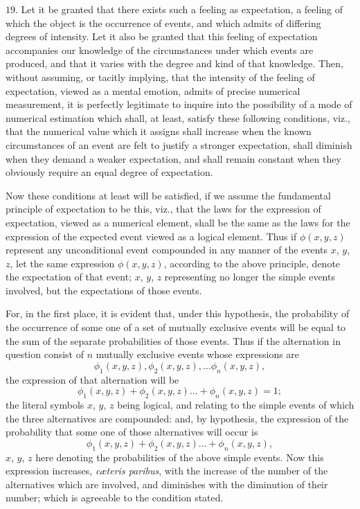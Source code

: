 \documentclass[oneside]{book}
\begin{document}
$19$. Let it be granted that there exists such a feeling as expectation,
a feeling of which the object is the occurrence of events,
and which admits of differing degrees of intensity. Let it also
be granted that this feeling of expectation accompanies our
knowledge of the circumstances under which events are produced,
and that it varies with the degree and kind of that knowledge.
Then, without assuming, or tacitly implying, that the intensity
of the feeling of expectation, viewed as a mental emotion, admits
of precise numerical measurement, it is perfectly legitimate to
inquire into the possibility of a mode of numerical estimation
which shall, at least, satisfy these following conditions, viz., that
the numerical value which it assigns shall increase when the
known circumstances of an event are felt to justify a stronger
expectation, shall diminish when they demand a weaker expectation,
and shall remain constant when they obviously require an
equal degree of expectation.

Now these conditions at least will be satisfied, if we assume
the fundamental principle of expectation to be this, viz., that the
laws for the expression of expectation, viewed as a numerical
element, shall be the same as the laws for the expression of the
expected event viewed as a logical element. Thus if $\phi(x, y, z)$ represent
any unconditional event compounded in any manner of
the events $x$, $y$, $z$, let the same expression $\phi(x, y, z)$, according
to the above principle, denote the expectation of that event;
$x$, $y$, $z$ representing no longer the simple events involved, but
the expectations of those events.

For, in the first place, it is evident that, under this hypothesis,
the probability of the occurrence of some one of a set of mutually
exclusive events will be equal to the sum of the separate probabilities
of those events. Thus if the alternation in question consist
of $n$ mutually exclusive events whose expressions are
\[
  \phi_1(x, y, z),\phi_2(x, y,z),\dotsc\phi_n(x, y, z),
\]
the expression of that alternation will be
\[
  \phi_1(x, y, z) + \phi_2(x, y,z)\dotsc + \phi_n(x, y, z) = 1;
\]
the literal symbols $x$, $y$, $z$ being logical, and relating to the simple
events of which the three alternatives are compounded:
and, by hypothesis, the expression of the probability that some
one of those alternatives will occur is
\[
  \phi_1(x, y, z) + \phi_2(x, y,z) \dotsc + \phi_n(x, y, z),
\]
$x$, $y$, $z$ here denoting the probabilities of the above simple events.
Now this expression increases, \emph{c\ae teris paribus}, with the increase
of the number of the alternatives which are involved, and diminishes
with the diminution of their number; which is agreeable
to the condition stated.
\end{document}
